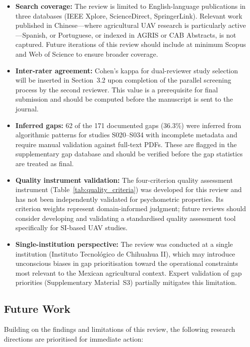 \documentclass[review,3p,times]{elsarticle}
\begin{document}
\begin{itemize}
  \item \textbf{Search coverage:} The review is limited to English-language publications in three databases (IEEE Xplore, ScienceDirect, SpringerLink). Relevant work published in Chinese---where agricultural UAV research is particularly active---Spanish, or Portuguese, or indexed in AGRIS or CAB Abstracts, is not captured. Future iterations of this review should include at minimum Scopus and Web of Science to ensure broader coverage.
  \item \textbf{Inter-rater agreement:} Cohen's kappa for dual-reviewer study selection will be inserted in Section~3.2 upon completion of the parallel screening process by the second reviewer. This value is a prerequisite for final submission and should be computed before the manuscript is sent to the journal.
  \item \textbf{Inferred gaps:} 62 of the 171 documented gaps (36.3\%) were inferred from algorithmic patterns for studies S020--S034 with incomplete metadata and require manual validation against full-text PDFs. These are flagged in the supplementary gap database and should be verified before the gap statistics are treated as final.
  \item \textbf{Quality instrument validation:} The four-criterion quality assessment instrument (Table~\ref{tab:quality_criteria}) was developed for this review and has not been independently validated for psychometric properties. Its criterion weights represent domain-informed judgment; future reviews should consider developing and validating a standardised quality assessment tool specifically for SI-based UAV studies.
  \item \textbf{Single-institution perspective:} The review was conducted at a single institution (Instituto Tecnológico de Chihuahua II), which may introduce unconscious biases in gap prioritisation toward the operational constraints most relevant to the Mexican agricultural context. Expert validation of gap priorities (Supplementary Material~S3) partially mitigates this limitation.
\end{itemize}

\subsection{Future Work}

Building on the findings and limitations of this review, the following research directions are prioritised for immediate action:
\end{document}
